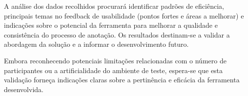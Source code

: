 A análise dos dados recolhidos procurará identificar padrões de eficiência, principais temas no feedback de usabilidade (pontos fortes e áreas a melhorar) e indicações sobre o potencial da ferramenta para melhorar a qualidade e consistência do processo de anotação. Os resultados destinam-se a validar a abordagem da solução e a informar o desenvolvimento futuro.

Embora reconhecendo potenciais limitações relacionadas com o número de participantes ou a artificialidade do ambiente de teste, espera-se que esta validação forneça indicações claras sobre a pertinência e eficácia da ferramenta desenvolvida.
